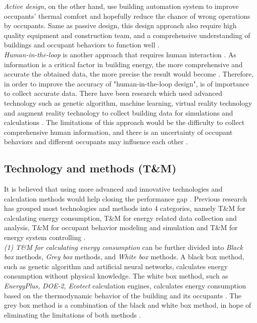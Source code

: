 \documentclass[a4paper, oneside]{discothesis}
\begin{document}
			\textit{Active design}, on the other hand, use building automation system to improve occupants' thermal comfort and hopefully reduce the chance of wrong operations by occupants. Same as passive design, this design approach also require high quality equipment and construction team, and a comprehensive understanding of buildings and occupant behaviors to function well \cite{DEWILDE201440}.\\

			\textit{Human-in-the-loop} is another approach that requires human interaction \cite{karwowski2001international}. As information is a critical factor in building energy, the more comprehensive and accurate the obtained data, the more precise the result would become \cite{NIU2016275}. Therefore, in order to improve the accuracy of "human-in-the-loop design", is of importance to collect accurate data. There have been research which used advanced technology such as genetic algorithm, machine learning, virtual reality technology and augment reality technology to collect building data for simulations and calculations \cite{karwowski2001international}. The limitations of this approach would be the difficulty to collect comprehensive human information, and there is an uncertainty of occupant behaviors and different occupants may influence each other \cite{masoso2010dark}.

		\subsection{Technology and methods (T\&M)}

			It is believed that using more advanced and innovative technologies and calculation methods would help closing the performance gap \cite{ZOU2018165}. Previous research has grouped most technologies and methods into 4 categories, namely T\&M for calculating energy consumption, T\&M for energy related data collection and analysis, T\&M for occupant behavior modeling and simulation and T\&M for energy system controlling \cite{ZOU2018165}.\\

			\textit{(1) T\&M for calculating energy consumption} can be further divided into \textit{Black box} methods, \textit{Grey box} methods, and \textit{White box} methods. A black box method, such as genetic algorithm and artificial neural networks, calculates energy consumption without physical knowledge. The white box method, such as \textit{EnergyPlus, DOE-2, Ecotect} calculation engines, calculates energy consumption based on the thermodynamic behavior of the building and its occupants \cite{li2014methods,xu2007optimal}. The grey box method is a combination of the black and white box method, in hope of eliminating the limitations of both methods \cite{ZOU2018165}.\\
\end{document}
